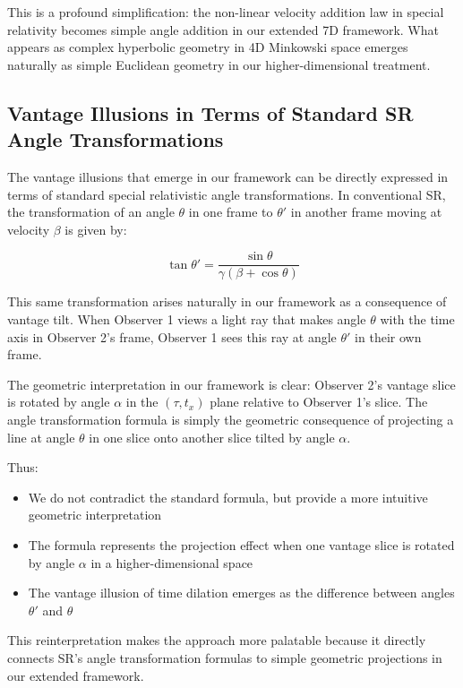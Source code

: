 \documentclass{article}
\begin{document}
This is a profound simplification: the non-linear velocity addition law in special relativity becomes simple angle addition in our extended 7D framework. What appears as complex hyperbolic geometry in 4D Minkowski space emerges naturally as simple Euclidean geometry in our higher-dimensional treatment.

\subsection{Vantage Illusions in Terms of Standard SR Angle Transformations}

The vantage illusions that emerge in our framework can be directly expressed in terms of standard special relativistic angle transformations. In conventional SR, the transformation of an angle $\theta$ in one frame to $\theta'$ in another frame moving at velocity $\beta$ is given by:

\begin{equation}
\tan\theta' = \frac{\sin\theta}{\gamma(\beta + \cos\theta)}
\end{equation}

This same transformation arises naturally in our framework as a consequence of vantage tilt. When Observer 1 views a light ray that makes angle $\theta$ with the time axis in Observer 2's frame, Observer 1 sees this ray at angle $\theta'$ in their own frame.

The geometric interpretation in our framework is clear: Observer 2's vantage slice is rotated by angle $\alpha$ in the $(\tau, t_x)$ plane relative to Observer 1's slice. The angle transformation formula is simply the geometric consequence of projecting a line at angle $\theta$ in one slice onto another slice tilted by angle $\alpha$.

Thus:
\begin{itemize}
\item We do not contradict the standard formula, but provide a more intuitive geometric interpretation
\item The formula represents the projection effect when one vantage slice is rotated by angle $\alpha$ in a higher-dimensional space
\item The vantage illusion of time dilation emerges as the difference between angles $\theta'$ and $\theta$
\end{itemize}

This reinterpretation makes the approach more palatable because it directly connects SR's angle transformation formulas to simple geometric projections in our extended framework.
\end{document}
